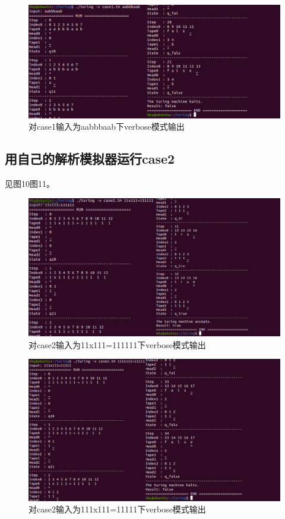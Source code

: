\documentclass[UTF8]{article}
\begin{document}
\begin{figure}[h]
  \centering
  \includegraphics[scale=0.6]{pic10.png}
  \caption{对case1输入为aabbbaab下verbose模式输出}
\end{figure}

\subsection{用自己的解析模拟器运行case2}
见图10图11。

\begin{figure}[h]
  \centering
  \includegraphics[scale=0.6]{pic11.png}
  \caption{对case2输入为11x111=111111下verbose模式输出}
\end{figure}

\begin{figure}[h]
  \centering
  \includegraphics[scale=0.6]{pic12.png}
  \caption{对case2输入为111x111=11111下verbose模式输出}
\end{figure}
\end{document}

